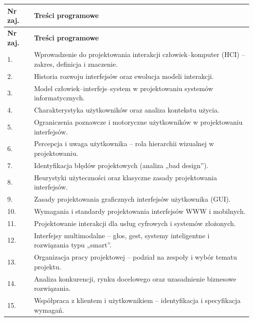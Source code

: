 \documentclass[12pt, a4paper]{article}
\newcommand{\thdrule}{\noalign{\global\setlength{\extrarowheight}{0pt}}}
\newcommand{\thdend}{\noalign{\global\setlength{\extrarowheight}{3pt}}}
\begin{document}
{\scriptsize
\begin{longtable}{m{1.5cm}m{14.5cm}}
\thdrule\toprule
\rowcolor{pjatkRed} {\color{white}\textbf{Nr zaj.}} & {\color{white}\textbf{Treści programowe}} \\
\midrule\thdend
\endfirsthead
\thdrule\toprule
\rowcolor{pjatkRed} {\color{white}\textbf{Nr zaj.}} & {\color{white}\textbf{Treści programowe}} \\
\midrule\thdend
\endhead
  \rowcolor{tableRowLight} 1. & Wprowadzenie do projektowania interakcji człowiek–komputer (HCI) – zakres, definicja i znaczenie. \\
  \rowcolor{tableRowAlt} 2. & Historia rozwoju interfejsów oraz ewolucja modeli interakcji. \\
  \rowcolor{tableRowLight} 3. & Model człowiek–interfejs–system w projektowaniu systemów informatycznych. \\
  \rowcolor{tableRowAlt} 4. & Charakterystyka użytkowników oraz analiza kontekstu użycia. \\
  \rowcolor{tableRowLight} 5. & Ograniczenia poznawcze i motoryczne użytkowników w projektowaniu interfejsów. \\
  \rowcolor{tableRowAlt} 6. & Percepcja i uwaga użytkownika – rola hierarchii wizualnej w projektowaniu. \\
  \rowcolor{tableRowLight} 7. & Identyfikacja błędów projektowych (analiza „bad design”). \\
  \rowcolor{tableRowAlt} 8. & Heurystyki użyteczności oraz klasyczne zasady projektowania interfejsów. \\
  \rowcolor{tableRowLight} 9. & Zasady projektowania graficznych interfejsów użytkownika (GUI). \\
  \rowcolor{tableRowAlt} 10. & Wymagania i standardy projektowania interfejsów WWW i mobilnych. \\
  \rowcolor{tableRowLight} 11. & Projektowanie interakcji dla usług cyfrowych i systemów złożonych. \\
  \rowcolor{tableRowAlt} 12. & Interfejsy multimodalne – głos, gest, systemy inteligentne i rozwiązania typu „smart”. \\
  \rowcolor{tableRowLight} 13. & Organizacja pracy projektowej – podział na zespoły i wybór tematu projektu. \\
  \rowcolor{tableRowAlt} 14. & Analiza konkurencji, rynku docelowego oraz uzasadnienie biznesowe rozwiązania. \\
  \rowcolor{tableRowLight} 15. & Współpraca z klientem i użytkownikiem – identyfikacja i specyfikacja wymagań. \\

\end{longtable}}
\end{document}
